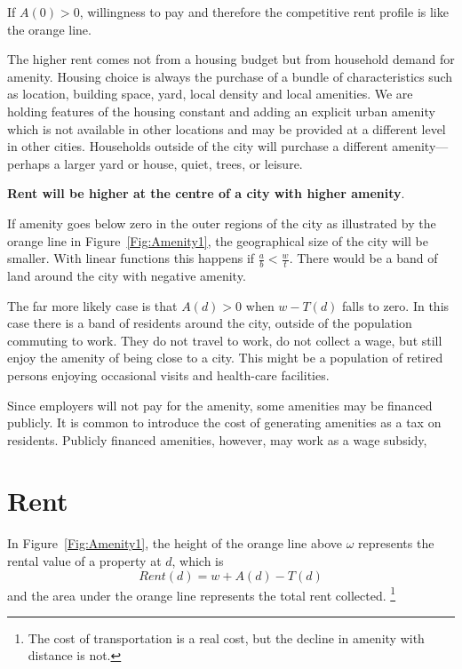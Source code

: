 If $A(0)>0$, willingness to pay and therefore the competitive rent profile is like the orange line.  
  
The  higher rent comes not from a housing budget but from household demand for amenity.  Housing choice is always the purchase of  a bundle of characteristics such as location, building space, yard, local density and local amenities.  We are holding features of the housing constant and adding an explicit urban amenity which is not available in other locations and may be provided at a different level in other cities.  Households outside of the city will purchase a different amenity---perhaps a larger yard or house, quiet,  trees, or leisure. 
  
  \textbf{Rent will be higher at the centre of a city with higher amenity}.   
    
   
If  amenity goes below zero in the outer regions of the city as illustrated by the orange line  in Figure~\ref{Fig:Amenity1}, the geographical size of the  city will be smaller.  With  linear functions this happens if $\frac{a}{b} < \frac{w}{t}$. There would be a band of land around the city with negative amenity. 
  
The far more likely case is that $A(d) > 0$ when $w-T(d)$ falls to zero. In this case there is a band of  residents around the city, outside of the population commuting to work. They do not travel to work,  do not collect a wage, but still enjoy the amenity of being close to a city. This might be a population of retired persons enjoying occasional visits and health-care facilities.





Since employers will not pay for the amenity, some amenities may be financed publicly. It is common to introduce the cost of generating amenities as a tax on residents. Publicly financed amenities, however, may work as a wage subsidy,  	

\section{Rent}
In Figure~\ref{Fig:Amenity1}, the height of the orange line above $\omega$ represents the rental value of a property at $d$, which is 
\begin{equation}
Rent(d)  =  w  + A(d) - T(d)	
\label{Eqn:Rent-at-d}\end{equation}
 and the area under the orange line represents the total rent collected.
 \footnote{The cost of transportation is a real cost, but the decline in amenity with distance is not.}
 
